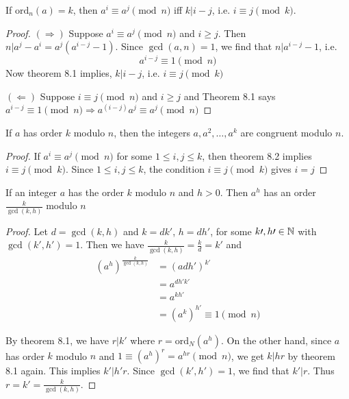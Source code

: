 \begin{theorem}
    If $\text{ord}_{n}(a) = k$, then $a^i \equiv a^j \pmod n$ iff $k | i - j$, i.e. $i \equiv j \pmod k$.
\end{theorem}
\begin{proof}
    $(\Rightarrow)$ Suppose $a^i \equiv a^j \pmod n$ and $i \geq j$.
    Then $n | a^j - a^i = a^j(a^{i-j} - 1)$.
    Since $\gcd(a, n) = 1$, we find that $n | a^{i-j} - 1$, i.e.
    \[
        a^{i-j} \equiv 1 \pmod n
    \]
    Now theorem 8.1 implies, $k | i-j$, i.e. $i \equiv j \pmod k$

    $(\Leftarrow)$ Suppose $i \equiv j \pmod n$ and $i \geq j$ and 
    Theorem 8.1 says $a^{i-j} \equiv 1 \pmod n \Rightarrow a^{(i-j)} a^j \equiv a^j \pmod n$
\end{proof}
\begin{corollary}
    If $a$ has order $k$ modulo $n$, then the integers $a, a^2, \dots, a^k$ are congruent modulo $n$.
\end{corollary}
\begin{proof}
    If $a^i \equiv a^j \pmod n$ for some $1 \leq i, j \leq k$, then theorem 8.2 implies $i \equiv j \pmod k$.
    Since $1 \leq i, j \leq k$, the condition $i \equiv j \pmod k$ gives $i = j$
\end{proof}

\begin{theorem}
    If an integer $a$ has the order $k$ modulo $n$ and $h > 0$. 
    Then $a^h$ has an order $\frac{k}{\gcd(k, h)}$ modulo $n$
\end{theorem}
\begin{proof}
    Let $d = \gcd(k, h)$ and $k = dk\prime$, $h = dh\prime$, 
    for some $k\prime, h\prime \in \mathbb{N}$ with $\gcd(k\prime, h\prime) = 1$.
    Then we have $\frac{k}{\gcd(k, h)} = \frac{k}{d} = k\prime$ and
    \[
        \begin{aligned}
            {(a^h)}^{\frac{k}{\gcd(k, h)}} &= {(adh\prime)}^{k\prime} \\
            &= a^{dh\prime k\prime} \\
            &= a^{kh\prime} \\
            &= {(a^k)}^{h\prime} \equiv 1 \pmod n
        \end{aligned}
    \]

    By theorem 8.1, we have $r | k\prime$ where $r = \text{ord}_N(a^h)$.
    On the other hand, since $a$ has order $k$ modulo $n$ and $1 \equiv {(a^h)}^r = a^{hr} \pmod n$,
    we get $k | hr$ by theorem 8.1 again. This implies $k\prime | h\prime r$. Since
    $\gcd(k\prime, h\prime) = 1$, we find that $k\prime | r$. Thus $r = k\prime = \frac{k}{\gcd(k, h)}$.
\end{proof}

